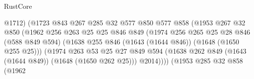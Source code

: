 \begin{lexlean}{RustCore}
\begin{coremodule}
                                        @1712)
                                      (@1723
                                        @843
                                        @267
                                        @285
                                        @32
                                        @577
                                        @850
                                        @577
                                        @858
                                        (@1953
                                          @267
                                          @32
                                          @850
                                          (@1962
                                            @256
                                            @263
                                            @25
                                            @25
                                            @846
                                            @849
                                            (@1974
                                              @256
                                              @265
                                              @25
                                              @28
                                              @846
                                              (@588 @849 @594)
                                              (@1638
                                                @255
                                                @846
                                                (@1643 (@1644 @846))
                                                (@1648 (@1650 @255 @25)))
                                              (@1974
                                                @263
                                                @53
                                                @25
                                                @27
                                                @849
                                                @594
                                                (@1638
                                                  @262
                                                  @849
                                                  (@1643 (@1644 @849))
                                                  (@1648 (@1650 @262 @25)))
                                                @2014))))
                                        (@1953
                                          @285
                                          @32
                                          @858
                                          (@1962

\end{coremodule}
\end{lexlean}
